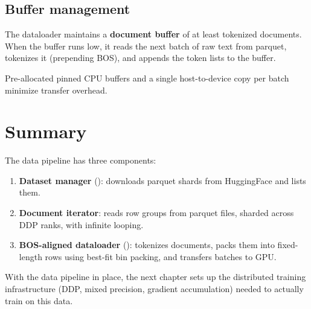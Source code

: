 \subsection{Buffer management}

The dataloader maintains a \textbf{document buffer} of at least  tokenized documents.  When the buffer runs low, it reads the next batch of raw text from parquet, tokenizes it (prepending BOS), and appends the token lists to the buffer.

Pre-allocated pinned CPU buffers and a single host-to-device copy per batch minimize transfer overhead.



\section{Summary}

The data pipeline has three components:

\begin{enumerate}
  \item \textbf{Dataset manager} (): downloads parquet shards from HuggingFace and lists them.
  \item \textbf{Document iterator}: reads row groups from parquet files, sharded across DDP ranks, with infinite looping.
  \item \textbf{BOS-aligned dataloader} (): tokenizes documents, packs them into fixed-length rows using best-fit bin packing, and transfers batches to GPU.
\end{enumerate}

With the data pipeline in place, the next chapter sets up the distributed training infrastructure (DDP, mixed precision, gradient accumulation) needed to actually train on this data.
